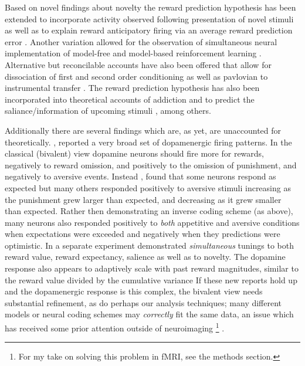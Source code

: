 \documentclass[doc,12pt]{apa}        %
\begin{document}
Based on novel findings about novelty \cite{Bunzeck:2006p5319, Blatter:2006p6372, GuitartMasip:2010p7244} the reward prediction hypothesis has been extended to incorporate activity observed following presentation of novel stimuli \cite{Kakade:2002p6414} as well as to explain reward anticipatory firing via an average reward prediction error \cite{Knutson:2007p1687}. Another variation allowed for the observation of simultaneous neural implementation of model-free and model-based reinforcement learning \cite{Smith:2006p7627, Daw:2011p7995}. Alternative but reconcilable accounts have also been offered that allow for dissociation of first and second order conditioning as well as pavlovian to instrumental transfer \cite{OReilly:2007p827}. The reward prediction hypothesis has also been incorporated into theoretical accounts of addiction \cite{Redish:2004p2531} and to predict the saliance/information of upcoming stimuli \cite{Behrens:2007p8839}, among others.   

Additionally there are several findings which are, as yet, are unaccounted for theoretically.  , reported a very broad set of dopamenergic firing patterns. In the classical (bivalent) view dopamine neurons should fire more for rewards, negatively to reward omission, and positively to the omission of punishment, and negatively to aversive events.   Instead , found that some neurons respond as expected but many others responded positively to aversive stimuli increasing as the punishment grew larger than expected, and decreasing as it grew smaller than expected.  Rather then demonstrating an inverse coding scheme (as above), many neurons also responded positively to \emph{both} appetitive and aversive conditions when expectations were exceeded and negatively when they predictions were optimistic.  In a separate experiment  demonstrated \emph{simultaneous} tunings to both reward value, reward expectancy, salience as well as to novelty.   The dopamine response also appears to adaptively scale with past reward magnitudes, similar to the reward value divided by the cumulative variance \cite{Tobler:2005p6373}  If these new reports hold up and the dopamenergic response is this complex, the bivalent view needs substantial refinement, as do perhaps our analysis techniques; many different models or neural coding schemes may \emph{correctly} fit the same data, an issue which has received some prior attention outside of neuroimaging
\footnote{
    For my take on solving this problem in fMRI, see the methods section.
} .
\end{document}
